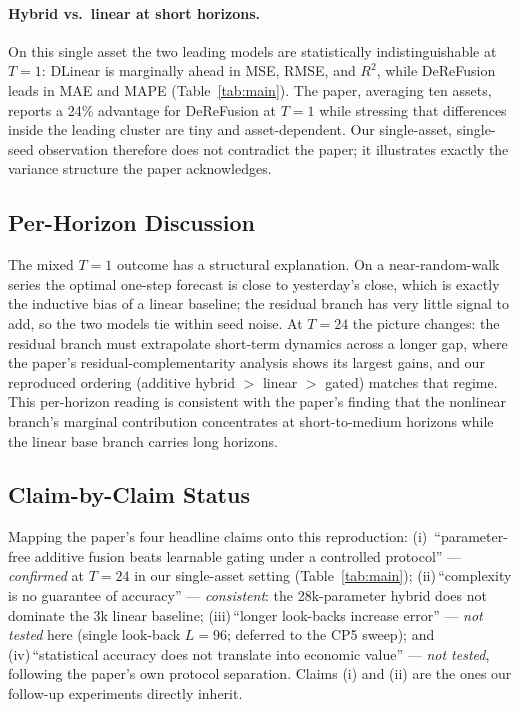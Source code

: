 \documentclass[conference]{IEEEtran}
\begin{document}
\paragraph{Hybrid vs.\ linear at short horizons.} On this single asset the
two leading models are statistically indistinguishable at $T=1$: DLinear is
marginally ahead in MSE, RMSE, and $R^2$, while DeReFusion leads in MAE and
MAPE (Table~\ref{tab:main}). The paper, averaging ten assets, reports a
24\% advantage for DeReFusion at $T=1$ while stressing that differences
inside the leading cluster are tiny and asset-dependent. Our
single-asset, single-seed observation therefore does not contradict the
paper; it illustrates exactly the variance structure the paper acknowledges.

\subsection{Per-Horizon Discussion}

The mixed $T=1$ outcome has a structural explanation. On a near-random-walk
series the optimal one-step forecast is close to yesterday's close, which is
exactly the inductive bias of a linear baseline; the residual branch has
very little signal to add, so the two models tie within seed noise. At
$T=24$ the picture changes: the residual branch must extrapolate short-term
dynamics across a longer gap, where the paper's residual-complementarity
analysis shows its largest gains, and our reproduced ordering (additive
hybrid $>$ linear $>$ gated) matches that regime. This per-horizon reading
is consistent with the paper's finding that the nonlinear branch's marginal
contribution concentrates at short-to-medium horizons while the linear base
branch carries long horizons.

\subsection{Claim-by-Claim Status}

Mapping the paper's four headline claims onto this reproduction: (i)\,
``parameter-free additive fusion beats learnable gating under a controlled
protocol'' --- \emph{confirmed} at $T=24$ in our single-asset setting
(Table~\ref{tab:main}); (ii)\,``complexity is no guarantee of accuracy'' ---
\emph{consistent}: the 28k-parameter hybrid does not dominate the 3k
linear baseline; (iii)\,``longer look-backs increase error'' ---
\emph{not tested} here (single look-back $L=96$; deferred to the CP5
sweep); and (iv)\,``statistical accuracy does not translate into economic
value'' --- \emph{not tested}, following the paper's own protocol
separation. Claims (i) and (ii) are the ones our follow-up experiments
directly inherit.
\end{document}
